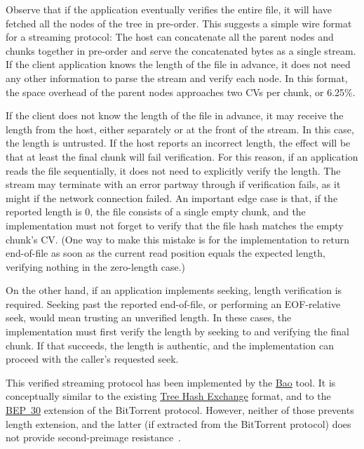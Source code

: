 \documentclass[11pt,notitlepage,a4paper]{article}
\begin{document}
Observe that if the application eventually verifies the entire file, it will
have fetched all the nodes of the tree in pre-order. This suggests a simple
wire format for a streaming protocol: The host can concatenate all the parent
nodes and chunks together in pre-order and serve the concatenated bytes as a
single stream. If the client application knows the length of the file in
advance, it does not need any other information to parse the stream and verify
each node. In this format, the space overhead of the parent nodes approaches
two CVs per chunk, or 6.25\%.

If the client does not know the length of the file in advance, it may receive
the length from the host, either separately or at the front of the stream. In
this case, the length is untrusted. If the host reports an incorrect length,
the effect will be that at least the final chunk will fail verification. For
this reason, if an application reads the file sequentially, it does not need to
explicitly verify the length. The stream may terminate with an error partway
through if verification fails, as it might if the network connection failed. An
important edge case is that, if the reported length is 0, the file consists of
a single empty chunk, and the implementation must not forget to verify that the
file hash matches the empty chunk's CV. (One way to make this mistake is for
the implementation to return end-of-file as soon as the current read position
equals the expected length, verifying nothing in the zero-length case.)

On the other hand, if an application implements seeking, length verification is
required. Seeking past the reported end-of-file, or performing an EOF-relative
seek, would mean trusting an unverified length. In these cases, the
implementation must first verify the length by seeking to and verifying the
final chunk. If that succeeds, the length is authentic, and the implementation
can proceed with the caller's requested seek.

This verified streaming protocol has been implemented by the
\href{https://github.com/oconnor663/bao}{Bao} tool. It is conceptually similar
to the existing
\href{https://adc.sourceforge.io/draft-jchapweske-thex-02.html}{Tree Hash
Exchange} format, and to the
\href{https://www.bittorrent.org/beps/bep_0030.html}{BEP~30} extension of the
BitTorrent protocol. However, neither of those prevents length extension, and
the latter (if extracted from the BitTorrent protocol) does not provide
second-preimage resistance~\cite[\S8.5]{DBLP:journals/tosc/DaemenMA18}.
\end{document}

